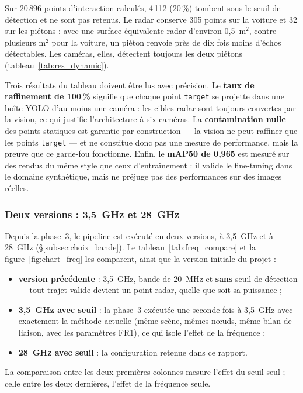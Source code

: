 \documentclass[12pt,a4paper,titlepage]{article}
\begin{document}
Sur 20\,896 points d'interaction calculés, 4\,112 (20\,\%) tombent sous le seuil de détection et ne sont pas retenus. Le radar conserve 305 points sur la voiture et 32 sur les piétons : avec une surface équivalente radar d'environ 0,5~m$^2$, contre plusieurs m$^2$ pour la voiture, un piéton renvoie près de dix fois moins d'échos détectables. Les caméras, elles, détectent toujours les deux piétons (tableau~\ref{tab:res_dynamic}).

Trois résultats du tableau doivent être lus avec précision. Le \textbf{taux de raffinement de 100\,\%} signifie que chaque point \texttt{target} se projette dans une boîte YOLO d'au moins une caméra : les cibles radar sont toujours couvertes par la vision, ce qui justifie l'architecture à six caméras. La \textbf{contamination nulle} des points statiques est garantie par construction --- la vision ne peut raffiner que les points \texttt{target} --- et ne constitue donc pas une mesure de performance, mais la preuve que ce garde-fou fonctionne. Enfin, le \textbf{mAP50 de 0,965} est mesuré sur des rendus du même style que ceux d'entraînement : il valide le fine-tuning dans le domaine synthétique, mais ne préjuge pas des performances sur des images réelles.

\subsubsection{Deux versions : 3,5~GHz et 28~GHz}

Depuis la phase~3, le pipeline est exécuté en deux versions, à 3,5~GHz et à 28~GHz (\S\ref{subsec:choix_bande}). Le tableau~\ref{tab:freq_compare} et la figure~\ref{fig:chart_freq} les comparent, ainsi que la version initiale du projet :
\begin{itemize}[leftmargin=1.5em]
    \item \textbf{version précédente} : 3,5~GHz, bande de 20~MHz et \textbf{sans} seuil de détection --- tout trajet valide devient un point radar, quelle que soit sa puissance ;
    \item \textbf{3,5~GHz avec seuil} : la phase~3 exécutée une seconde fois à 3,5~GHz avec exactement la méthode actuelle (même scène, mêmes n\oe uds, même bilan de liaison, avec les paramètres FR1), ce qui isole l'effet de la fréquence ;
    \item \textbf{28~GHz avec seuil} : la configuration retenue dans ce rapport.
\end{itemize}
La comparaison entre les deux premières colonnes mesure l'effet du seuil seul ; celle entre les deux dernières, l'effet de la fréquence seule.
\end{document}
